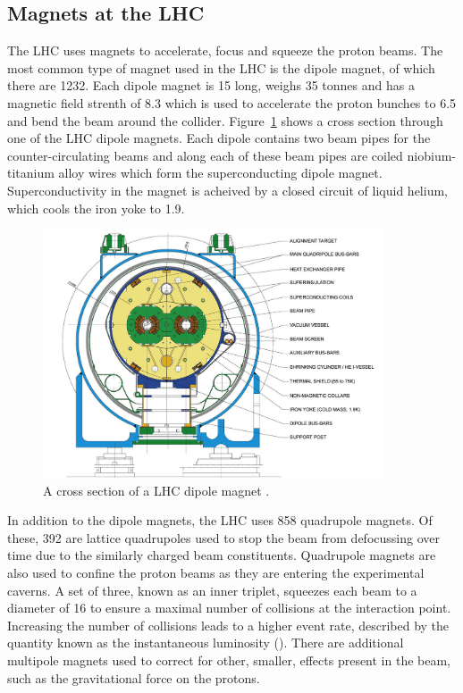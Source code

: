 \subsection{Magnets at the LHC}
\label{ssec:LHCmag}
The LHC uses magnets to accelerate, focus and squeeze the proton beams.
The most common type of magnet used in the LHC is the dipole magnet, of which there are 1232.
Each dipole magnet is 15\m{} long, weighs 35 tonnes and has a magnetic field strenth of 8.3\Tesla{} which is used to accelerate the proton bunches to 6.5\TeV{} and bend the beam around the collider. 
Figure~\ref{fig:LHCdipole} shows a cross section through one of the LHC dipole magnets.
Each dipole contains two beam pipes for the counter-circulating beams and along each of these beam pipes are coiled niobium-titanium alloy wires which form the superconducting dipole magnet. 
Superconductivity in the magnet is acheived by a closed circuit of liquid helium, which cools the iron yoke to 1.9\Kelvin{}.
\begin{figure}[htpb]
	\centering
	\includegraphics[width=0.9\textwidth]{Figures/LHCdipole}
	\caption[A cross section of a LHC dipole magnet]{A cross section of a LHC dipole magnet \cite{LHCdipolemagnet}. }
	\label{fig:LHCdipole}
\end{figure}

In addition to the dipole magnets, the LHC uses 858 quadrupole magnets. 
Of these, 392 are lattice quadrupoles used to stop the beam from defocussing over time due to the similarly charged beam constituents. 
Quadrupole magnets are also used to confine the proton beams as they are entering the experimental caverns. A set of three, known as an inner triplet, squeezes each beam to a diameter of 16\um{} to ensure a maximal number of collisions at the interaction point.
Increasing the number of collisions leads to a higher event rate, described by the quantity known as the instantaneous luminosity (\Lum{}). %
There are additional multipole magnets used to correct for other, smaller, effects present in the beam, such as the gravitational force on the protons. 


